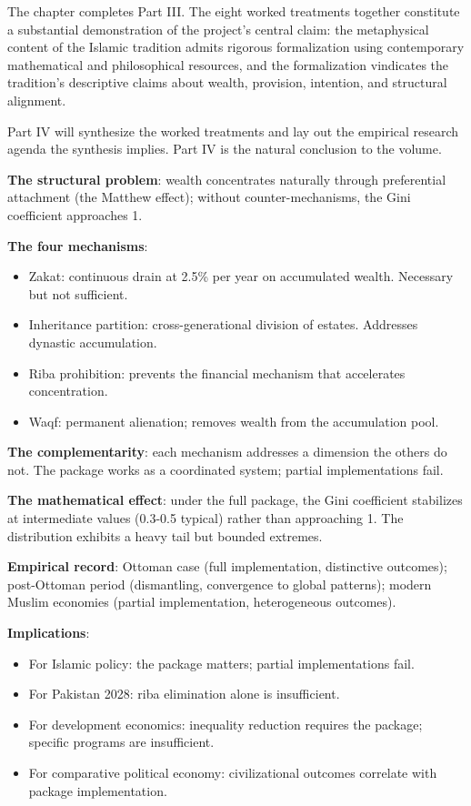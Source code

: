 The chapter completes Part III. The eight worked treatments
together constitute a substantial demonstration of the project's
central claim: the metaphysical content of the Islamic tradition
admits rigorous formalization using contemporary mathematical and
philosophical resources, and the formalization vindicates the
tradition's descriptive claims about wealth, provision, intention,
and structural alignment.

Part IV will synthesize the worked treatments and lay out the
empirical research agenda the synthesis implies. Part IV is the
natural conclusion to the volume.

\begin{summarybox}
\textbf{The structural problem}: wealth concentrates naturally
through preferential attachment (the Matthew effect); without
counter-mechanisms, the Gini coefficient approaches 1.

\textbf{The four mechanisms}:
\begin{itemize}[leftmargin=1.5em]
    \item Zakat: continuous drain at 2.5\% per year on accumulated
    wealth. Necessary but not sufficient.
    \item Inheritance partition: cross-generational division of
    estates. Addresses dynastic accumulation.
    \item Riba prohibition: prevents the financial mechanism that
    accelerates concentration.
    \item Waqf: permanent alienation; removes wealth from the
    accumulation pool.
\end{itemize}

\textbf{The complementarity}: each mechanism addresses a
dimension the others do not. The package works as a coordinated
system; partial implementations fail.

\textbf{The mathematical effect}: under the full package, the
Gini coefficient stabilizes at intermediate values (0.3-0.5
typical) rather than approaching 1. The distribution exhibits a
heavy tail but bounded extremes.

\textbf{Empirical record}: Ottoman case (full implementation,
distinctive outcomes); post-Ottoman period (dismantling,
convergence to global patterns); modern Muslim economies (partial
implementation, heterogeneous outcomes).

\textbf{Implications}:
\begin{itemize}[leftmargin=1.5em]
    \item For Islamic policy: the package matters; partial
    implementations fail.
    \item For Pakistan 2028: riba elimination alone is insufficient.
    \item For development economics: inequality reduction requires
    the package; specific programs are insufficient.
    \item For comparative political economy: civilizational
    outcomes correlate with package implementation.
\end{itemize}


\end{summarybox}

